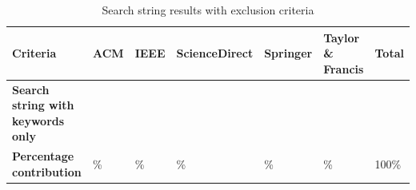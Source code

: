\begin{table}[htbp]
	\centering
	\caption{Search string results with exclusion criteria}
	\label{table:search_results_exclusion}
	\begin{tabular}{p{4.8cm}p{1.7cm}p{1.7cm}p{1.7cm}p{1.7cm}p{2cm}p{1.4cm}}
		\toprule
		\textbf{Criteria}                                        & \textbf{ACM} & \textbf{IEEE} & \textbf{ScienceDirect} & \textbf{Springer} & \textbf{Taylor \& Francis} & \textbf{Total} \\
		\midrule
		\textbf{Search string with keywords only} & \iacm{}      & \iieee{}      & \isd{}                 & \ispr{}           & \itf{}                     & \itot{}        \\
		\addlinespace[0.8em]
		\textbf{Percentage contribution}                          & \iacmp{}\%   & \iieeep{}\%   & \isdp{}\%              & \isprp{}\%        & \itfp{}\%                  & 100\%          \\
		\bottomrule
	\end{tabular}
\end{table}

